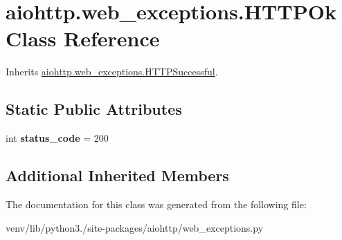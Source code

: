 \hypertarget{classaiohttp_1_1web__exceptions_1_1_h_t_t_p_ok}{}\section{aiohttp.\+web\+\_\+exceptions.\+H\+T\+T\+P\+Ok Class Reference}
\label{classaiohttp_1_1web__exceptions_1_1_h_t_t_p_ok}


Inherits \hyperlink{classaiohttp_1_1web__exceptions_1_1_h_t_t_p_successful}{aiohttp.\+web\+\_\+exceptions.\+H\+T\+T\+P\+Successful}.

\subsection*{Static Public Attributes}
\begin{DoxyCompactItemize}
\item 
\mbox{\label{classaiohttp_1_1web__exceptions_1_1_h_t_t_p_ok_a72e37bc7183a57320d3413a4e3f91553}} 
int {\bfseries status\+\_\+code} = 200
\end{DoxyCompactItemize}
\subsection*{Additional Inherited Members}


The documentation for this class was generated from the following file\+:\begin{DoxyCompactItemize}
\item 
venv/lib/python3./site-\/packages/aiohttp/web\+\_\+exceptions.\+py\end{DoxyCompactItemize}

